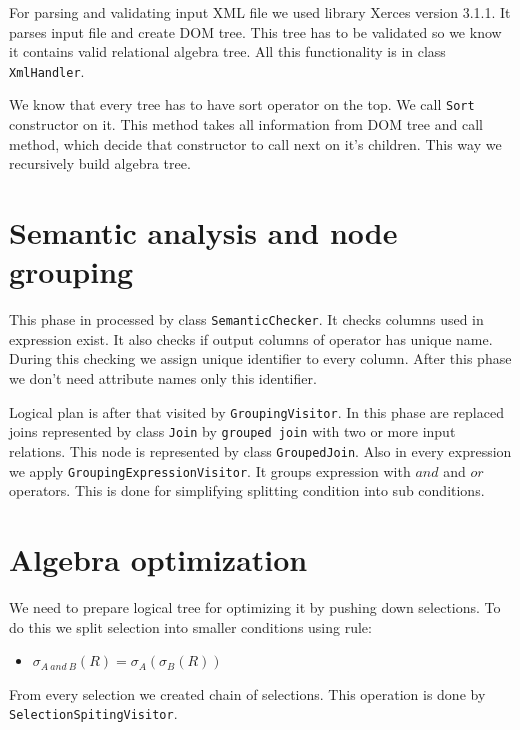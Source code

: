 For parsing and validating input XML file we used library Xerces version 3.1.1\cite{xerces}. It parses input file and create DOM tree. This tree has to be validated so we know it contains valid relational algebra tree. All this functionality is in class \texttt{XmlHandler}.

We know that every tree has to have sort operator on the top. We call \texttt{Sort} constructor on it. This method takes all information from DOM tree and call method, which decide that constructor to call next on it's children. This way we recursively build algebra tree.



\section{Semantic analysis and node grouping}

This phase in processed by class \texttt{SemanticChecker}. It checks columns used in expression exist. It also checks if output columns of operator has unique name. During this checking we assign unique identifier to every column. After this phase we don't need attribute names only this identifier.

Logical plan is after that visited by \texttt{GroupingVisitor}. In this phase are replaced joins represented by class \texttt{Join} by \texttt{grouped join} with two or more input relations. This node is represented by class \texttt{GroupedJoin}. Also in every expression we apply \texttt{GroupingExpressionVisitor}. It groups expression with $and$ and $or$ operators. This is done for simplifying splitting condition into sub conditions.

\section{Algebra optimization}

We need to prepare logical tree for optimizing it by pushing down selections. To do this we split selection into smaller conditions using rule:
\begin{itemize}
\item $\sigma_{A~and~B}(R)=\sigma_{A}(\sigma_{B}(R))$
\end{itemize}
From every selection we created chain of selections. This operation is done by \texttt{SelectionSpitingVisitor}.

